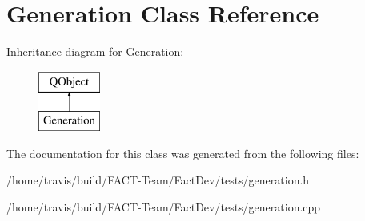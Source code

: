 \hypertarget{classGeneration}{\section{Generation Class Reference}
\label{classGeneration}
}
Inheritance diagram for Generation\-:\begin{figure}[H]
\begin{center}
\leavevmode
\includegraphics[height=2.000000cm]{d4/df7/classGeneration}
\end{center}
\end{figure}


The documentation for this class was generated from the following files\-:\begin{DoxyCompactItemize}
\item 
/home/travis/build/\-F\-A\-C\-T-\/\-Team/\-Fact\-Dev/tests/generation.\-h\item 
/home/travis/build/\-F\-A\-C\-T-\/\-Team/\-Fact\-Dev/tests/generation.\-cpp\end{DoxyCompactItemize}
